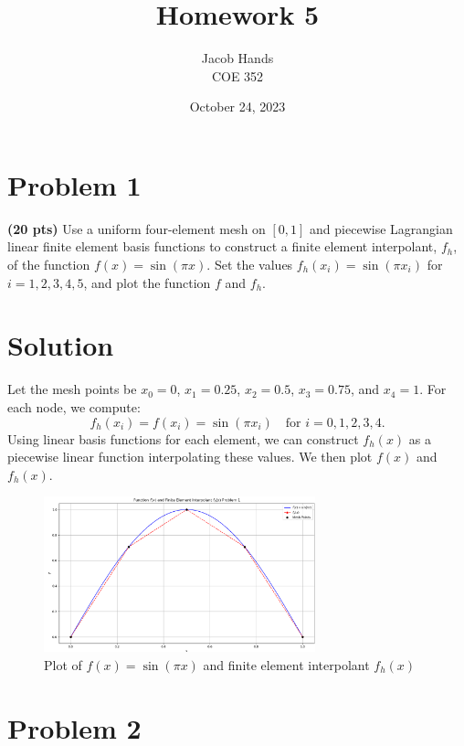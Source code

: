 \documentclass[11pt]{article}
\title{Homework 5}
\author{Jacob Hands \\ COE 352}
\date{October 24, 2023}
\begin{document}
\maketitle

\section*{Problem 1}

\textbf{(20 pts)} Use a uniform four-element mesh on $[0, 1]$ and piecewise Lagrangian linear finite element basis functions to construct a finite element interpolant, \( f_h \), of the function \( f(x) = \sin(\pi x) \). Set the values \( f_h(x_i) = \sin(\pi x_i) \) for \( i = 1, 2, 3, 4, 5 \), and plot the function \( f \) and \( f_h \).

\section*{Solution}

Let the mesh points be \( x_0 = 0 \), \( x_1 = 0.25 \), \( x_2 = 0.5 \), \( x_3 = 0.75 \), and \( x_4 = 1 \). For each node, we compute:
\[
f_h(x_i) = f(x_i) = \sin(\pi x_i) \quad \text{for } i = 0, 1, 2, 3, 4.
\]
Using linear basis functions for each element, we can construct \( f_h(x) \) as a piecewise linear function interpolating these values. We then plot \( f(x) \) and \( f_h(x) \).

\begin{figure}[!h]
    \centering
    \includegraphics[width=0.7\textwidth]{images/problem1.png}
    \caption{Plot of $f(x) = \sin(\pi x)$ and finite element interpolant $f_h(x)$}
\end{figure}
\FloatBarrier

\newpage

\section*{Problem 2}
\end{document}
